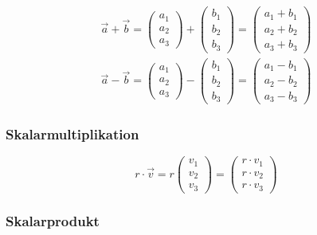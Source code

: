 \begin{eqnarray}
	\overrightarrow{a} + \overrightarrow{b}
	= \left( \begin{array}{c} a_1\\a_2\\a_3\end{array}\right) + \left( \begin{array}{c} b_1\\b_2\\b_3\end{array}\right)
	= \left( \begin{array}{c} a_1 + b_1\\a_2 + b_2\\a_3 + b_3\end{array}\right) \\
	\overrightarrow{a} - \overrightarrow{b}
	= \left( \begin{array}{c} a_1\\a_2\\a_3\end{array}\right) - \left( \begin{array}{c} b_1\\b_2\\b_3\end{array}\right)
	= \left( \begin{array}{c} a_1 - b_1\\a_2 - b_2\\a_3 - b_3\end{array}\right)
\end{eqnarray}

\subsubsection{Skalarmultiplikation}
\label{ssub:skalarmultiplikation}

\begin{equation}
	r \cdot \overrightarrow{v} = r \left( \begin{array}{c} v_1\\v_2\\v_3\end{array}\right)
	= \left( \begin{array}{c}r \cdot v_1\\r \cdot v_2\\r \cdot v_3\end{array}\right)
\end{equation}

\subsubsection{Skalarprodukt} 
\label{ssub:skalarprodukt}

